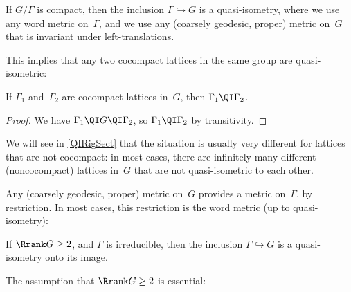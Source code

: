\begin{cor}
 If $G/\Gamma$ is compact, then the inclusion\/
$\Gamma \hookrightarrow G$ is a quasi-isometry, where we
use any word metric on\/~$\Gamma$, and we use any\/
\textup(coarsely geodesic, proper\/\textup) metric on~$G$ that is invariant under left-translations.
 \end{cor}
 
This implies that any two cocompact lattices in the same group are quasi-isometric:

\begin{cor} \label{CpctLattQI}
If\/ $\Gamma_1$ and~$\Gamma_2$ are cocompact lattices in~$G$, then $\Gamma_1 \QI \Gamma_2$.
\end{cor}

\begin{proof}
We have $\Gamma_1 \QI G \QI \Gamma_2$, so $\Gamma_1 \QI \Gamma_2$ by transitivity.
\end{proof}

We will see in \cref{QIRigSect} that the situation is usually very different for lattices that are not cocompact: in most cases, there are infinitely many different (noncocompact) lattices in~$G$ that are not quasi-isometric to each other.

Any (coarsely geodesic, proper) metric on~$G$ provides a metric on~$\Gamma$, by restriction. In most cases, this restriction is the word metric (up to quasi-isometry):

\begin{thm} \label{LMRThm}
 If\/ $\Rrank G \ge 2$, and\/ $\Gamma$ is irreducible, then the inclusion\/ $\Gamma \hookrightarrow G$ is a quasi-isometry onto its image.
 \end{thm}

The assumption that $\Rrank G \ge 2$ is essential:


